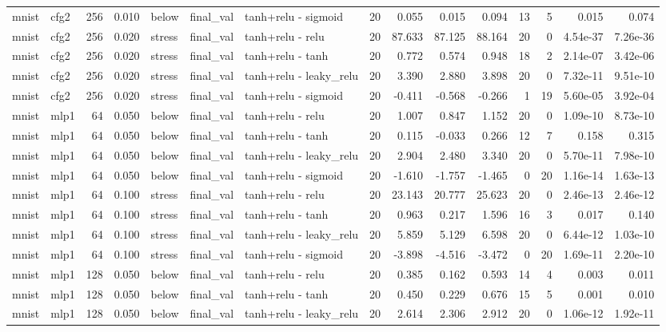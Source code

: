 \begin{table}[htbp]
{\begin{tabular}{@{}llrrlllrrrrrrrr@{}}
mnist & cfg2 & 256 & 0.010 & below & final\_val & tanh+relu - sigmoid & 20 & 0.055 & 0.015 & 0.094 & 13 & 5 & 0.015 & 0.074 \\
mnist & cfg2 & 256 & 0.020 & stress & final\_val & tanh+relu - relu & 20 & 87.633 & 87.125 & 88.164 & 20 & 0 & 4.54e-37 & 7.26e-36 \\
mnist & cfg2 & 256 & 0.020 & stress & final\_val & tanh+relu - tanh & 20 & 0.772 & 0.574 & 0.948 & 18 & 2 & 2.14e-07 & 3.42e-06 \\
mnist & cfg2 & 256 & 0.020 & stress & final\_val & tanh+relu - leaky\_relu & 20 & 3.390 & 2.880 & 3.898 & 20 & 0 & 7.32e-11 & 9.51e-10 \\
mnist & cfg2 & 256 & 0.020 & stress & final\_val & tanh+relu - sigmoid & 20 & -0.411 & -0.568 & -0.266 & 1 & 19 & 5.60e-05 & 3.92e-04 \\
mnist & mlp1 & 64 & 0.050 & below & final\_val & tanh+relu - relu & 20 & 1.007 & 0.847 & 1.152 & 20 & 0 & 1.09e-10 & 8.73e-10 \\
mnist & mlp1 & 64 & 0.050 & below & final\_val & tanh+relu - tanh & 20 & 0.115 & -0.033 & 0.266 & 12 & 7 & 0.158 & 0.315 \\
mnist & mlp1 & 64 & 0.050 & below & final\_val & tanh+relu - leaky\_relu & 20 & 2.904 & 2.480 & 3.340 & 20 & 0 & 5.70e-11 & 7.98e-10 \\
mnist & mlp1 & 64 & 0.050 & below & final\_val & tanh+relu - sigmoid & 20 & -1.610 & -1.757 & -1.465 & 0 & 20 & 1.16e-14 & 1.63e-13 \\
mnist & mlp1 & 64 & 0.100 & stress & final\_val & tanh+relu - relu & 20 & 23.143 & 20.777 & 25.623 & 20 & 0 & 2.46e-13 & 2.46e-12 \\
mnist & mlp1 & 64 & 0.100 & stress & final\_val & tanh+relu - tanh & 20 & 0.963 & 0.217 & 1.596 & 16 & 3 & 0.017 & 0.140 \\
mnist & mlp1 & 64 & 0.100 & stress & final\_val & tanh+relu - leaky\_relu & 20 & 5.859 & 5.129 & 6.598 & 20 & 0 & 6.44e-12 & 1.03e-10 \\
mnist & mlp1 & 64 & 0.100 & stress & final\_val & tanh+relu - sigmoid & 20 & -3.898 & -4.516 & -3.472 & 0 & 20 & 1.69e-11 & 2.20e-10 \\
mnist & mlp1 & 128 & 0.050 & below & final\_val & tanh+relu - relu & 20 & 0.385 & 0.162 & 0.593 & 14 & 4 & 0.003 & 0.011 \\
mnist & mlp1 & 128 & 0.050 & below & final\_val & tanh+relu - tanh & 20 & 0.450 & 0.229 & 0.676 & 15 & 5 & 0.001 & 0.010 \\
mnist & mlp1 & 128 & 0.050 & below & final\_val & tanh+relu - leaky\_relu & 20 & 2.614 & 2.306 & 2.912 & 20 & 0 & 1.06e-12 & 1.92e-11 \\

\end{tabular}}
\end{table}

